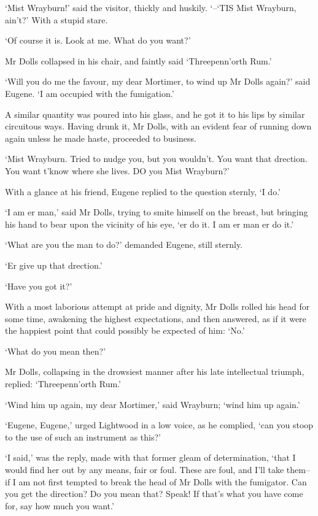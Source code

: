 ‘Mist Wrayburn!’ said the visitor, thickly and huskily. ‘--‘TIS Mist
Wrayburn, ain’t?’ With a stupid stare.

‘Of course it is. Look at me. What do you want?’

Mr Dolls collapsed in his chair, and faintly said ‘Threepenn’orth Rum.’

‘Will you do me the favour, my dear Mortimer, to wind up Mr Dolls
again?’ said Eugene. ‘I am occupied with the fumigation.’

A similar quantity was poured into his glass, and he got it to his lips
by similar circuitous ways. Having drunk it, Mr Dolls, with an evident
fear of running down again unless he made haste, proceeded to business.

‘Mist Wrayburn. Tried to nudge you, but you wouldn’t. You want that
drection. You want t’know where she lives. DO you Mist Wrayburn?’

With a glance at his friend, Eugene replied to the question sternly, ‘I
do.’

‘I am er man,’ said Mr Dolls, trying to smite himself on the breast, but
bringing his hand to bear upon the vicinity of his eye, ‘er do it. I am
er man er do it.’

‘What are you the man to do?’ demanded Eugene, still sternly.

‘Er give up that drection.’

‘Have you got it?’

With a most laborious attempt at pride and dignity, Mr Dolls rolled
his head for some time, awakening the highest expectations, and then
answered, as if it were the happiest point that could possibly be
expected of him: ‘No.’

‘What do you mean then?’

Mr Dolls, collapsing in the drowsiest manner after his late intellectual
triumph, replied: ‘Threepenn’orth Rum.’

‘Wind him up again, my dear Mortimer,’ said Wrayburn; ‘wind him up
again.’

‘Eugene, Eugene,’ urged Lightwood in a low voice, as he complied, ‘can
you stoop to the use of such an instrument as this?’

‘I said,’ was the reply, made with that former gleam of determination,
‘that I would find her out by any means, fair or foul. These are foul,
and I’ll take them--if I am not first tempted to break the head of Mr
Dolls with the fumigator. Can you get the direction? Do you mean that?
Speak! If that’s what you have come for, say how much you want.’

